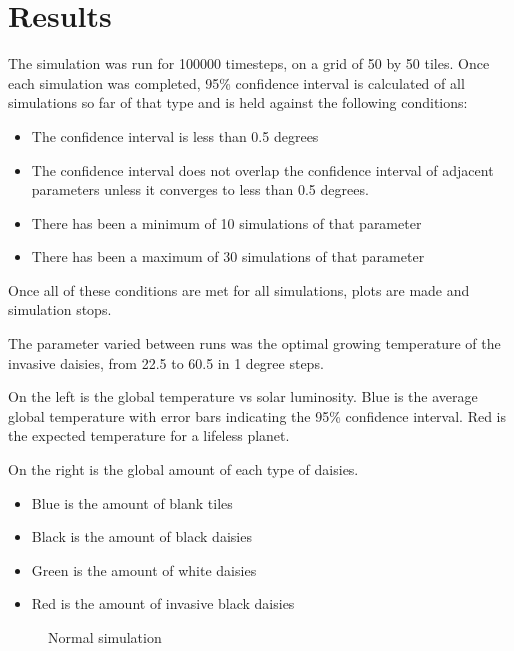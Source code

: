 \documentclass[12pt]{article}
\begin{document}
\section{Results}
The simulation was run for 100000 timesteps, on a grid of 50 by 50
tiles. Once each simulation was completed, 95\% confidence interval is
calculated of all simulations so far of that type and is held against
the following conditions:
\begin{itemize}
\item The confidence interval is less than 0.5 degrees
\item The confidence interval does not overlap the confidence interval
  of adjacent parameters unless it converges to less than 0.5 degrees.
\item There has been a minimum of 10 simulations of that parameter
\item There has been a maximum of 30 simulations of that parameter
\end{itemize}

Once all of these conditions are met for all simulations, plots are
made and simulation stops.

The parameter varied between runs was the optimal growing temperature
of the invasive daisies, from 22.5 to 60.5 in 1 degree steps.

On the left is the global temperature vs solar luminosity.
Blue is the average global temperature with error bars indicating the
95\% confidence interval. Red is the expected temperature for a
lifeless planet.

On the right is the global amount of each type of daisies.
\begin{itemize}
\item Blue is the amount of blank tiles
\item Black is the amount of black daisies
\item Green is the amount of white daisies
\item Red is the amount of invasive black daisies
\end{itemize}

\begin{figure}[ht]
  \centering
  \hfill
  \caption{Normal simulation}
\end{figure}
\end{document}
